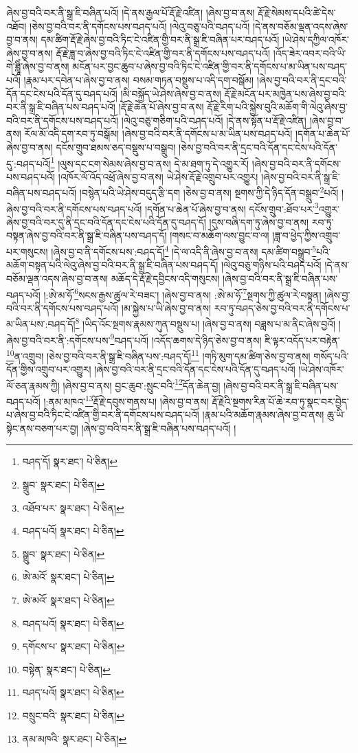 ཞེས་བྱ་བའི་བར་ནི་སྒྲ་ཇི་བཞིན་པའོ། །དེ་ནས་རྒྱལ་པོ་རྡོ་རྗེ་འཛིན། །ཞེས་བྱ་བ་ནས། རྡོ་རྗེ་སེམས་དཔའི་ཚེ་དེས་འཐོབ། །ཅེས་བྱ་བའི་བར་ནི་དགོངས་པས་བཤད་པའོ། །ལེའུ་བཅུ་པའི་བཤད་པའོ། །དེ་ནས་བཅོམ་ལྡན་འདས་ཞེས་བྱ་བ་ནས། དམ་ཚིག་རྡོ་རྗེ་ཞེས་བྱ་བའི་ཏིང་ངེ་འཛིན་གྱི་བར་ནི་སྒྲ་ཇི་བཞིན་པར་བཤད་པའོ། །ཡེ་ཤེས་དཀྱིལ་འཁོར་ཞེས་བྱ་བ་ནས། རྡོ་རྗེ་ཟླ་བ་ཞེས་བྱ་བའི་ཏིང་ངེ་འཛིན་གྱི་བར་ནི་དགོངས་པས་བཤད་པའོ། །འོད་ཟེར་འབར་བའི་ཡི་གེ་ཐླཱིཾ་ཞེས་བྱ་བ་ནས། མངོན་པར་བྱང་ཆུབ་པ་ཞེས་བྱ་བའི་ཏིང་ངེ་འཛིན་གྱི་བར་ནི་དགོངས་པ་མ་ཡིན་པས་བཤད་པའོ། །རྣམ་པར་དབེན་པ་ཞེས་བྱ་བ་ནས། བསམ་གཏན་བསྡུས་པ་འདི་དག་བསྒོམ། །ཞེས་བྱ་བའི་བར་ནི་དྲང་བའི་དོན་དང་ངེས་པའི་དོན་དུ་བཤད་པའོ། །མི་བསྐྱོད་ཡེ་ཤེས་ཞེས་བྱ་བ་ནས། རྡོ་རྗེ་མངོན་པར་མཁྱེན་པས་ཞེས་བྱ་བའི་བར་ནི་སྒྲ་ཇི་བཞིན་པས་བཤད་པའོ། །རྡོ་རྗེ་ཆེན་པོ་ཞེས་བྱ་བ་ནས། རྡོ་རྗེ་རིག་པའི་སྐྱེས་བུའི་མཆོག་གི་ལེའུ་ཞེས་བྱ་བའི་བར་ནི་དགོངས་པས་བཤད་པའོ། །ལེའུ་བཅུ་གཅིག་པའི་བཤད་པའོ། །དེ་ནས་སྟོན་པ་རྡོ་རྗེ་འཛིན། །ཞེས་བྱ་བ་ནས། རོལ་མོ་འདི་དག་རབ་ཏུ་བསྒོམ། །ཞེས་བྱ་བའི་བར་ནི་དགོངས་པ་མ་ཡིན་པས་བཤད་པའོ། །དགོན་པ་ཆེན་པོ་ཞེས་བྱ་བ་ནས། དངོས་གྲུབ་ཐམས་ཅད་བསྡུས་པ་བསྒྲུབ། །ཅེས་བྱ་བའི་བར་ནི་དྲང་བའི་དོན་དང་ངེས་པའི་དོན་དུ་:བཤད་པའོ།\footnote{བཤད་དོ།  སྣར་ཐང་།  པེ་ཅིན། } །ལུས་དང་ངག་སེམས་ཞེས་བྱ་བ་ནས། དེ་མ་ཐག་ཏུ་དེ་འགྱུར་རོ། །ཞེས་བྱ་བའི་བར་ནི་དགོངས་པས་བཤད་པའོ། །འཁོར་ལོ་འོད་འཕྲོ་ཞེས་བྱ་བ་ནས། ཡེ་ཤེས་རྡོ་རྗེ་འགྲུབ་པར་འགྱུར། །ཞེས་བྱ་བའི་བར་ནི་སྒྲ་ཇི་བཞིན་པས་བཤད་པའོ། །བསྙེན་པའི་ཡེ་ཤེས་བདུད་རྩི་དག །ཅེས་བྱ་བ་ནས། སྔགས་ཀྱི་དེ་ཉིད་དོན་བསྒྲུབ་\footnote{སྒྲུབ་  སྣར་ཐང་།  པེ་ཅིན། }པའོ། །ཞེས་བྱ་བའི་བར་ནི་དགོངས་པས་བཤད་པའོ། །དགོན་པ་ཆེན་པོ་ཞེས་བྱ་བ་ནས། དངོས་གྲུབ་:ཐོབ་པར་\footnote{འཐོབ་པར་  སྣར་ཐང་།  པེ་ཅིན། }འགྱུར་ཞེས་བྱ་བའི་བར་དུ་ནི་དྲང་བའི་དོན་དང་ངེས་པའི་དོན་དུ་བཤད་དོ། །དུས་བཞི་དག་ཏུ་ཞེས་བྱ་བ་ནས། རབ་ཏུ་བསྟན་ཞེས་བྱ་བའི་བར་ནི་སྒྲ་ཇི་བཞིན་པས་བཤད་དོ། །གསང་བ་མཆོག་ལས་བྱུང་བ་ལ། །ཟླ་བ་ཕྱེད་ཀྱིས་འགྲུབ་པར་གསུངས། །ཞེས་བྱ་བ་ནི་དགོངས་པས་:བཤད་དོ།\footnote{བཤད་པའོ།  སྣར་ཐང་།  པེ་ཅིན། } །དེ་ལ་འདི་ནི་ཞེས་བྱ་བ་ནས། དམ་ཚིག་བསྒྲུབ་\footnote{སྒྲུབ་  སྣར་ཐང་།  པེ་ཅིན། }པའི་མཆོག་བསྟན་པའི་ལེའུ་ཞེས་བྱ་བའི་བར་ནི་སྒྲ་ཇི་བཞིན་པས་བཤད་དོ། །ལེའུ་བཅུ་གཉིས་པའི་བཤད་པའོ། །དེ་ནས་བཅོམ་ལྡན་འདས་ཞེས་བྱ་བ་ནས། མཆོད་དེ་རྡོ་རྗེ་དབྱིངས་འདི་གསུངས། །ཞེས་བྱ་བའི་བར་ནི་སྒྲ་ཇི་བཞིན་པས་བཤད་པའོ། །:ཨེ་མ་ཧོ་\footnote{ཨེ་མའོ་  སྣར་ཐང་།  པེ་ཅིན། }སངས་རྒྱས་ཚུལ་རེ་བཟང་། །ཞེས་བྱ་བ་ནས། :ཨེ་མ་ཧོ་\footnote{ཨེ་མའོ་  སྣར་ཐང་།  པེ་ཅིན། }སྔགས་ཀྱི་ཚུལ་རེ་བསྟན། །ཞེས་བྱ་བའི་བར་ནི་དགོངས་པས་བཤད་པའོ། །མ་སྐྱེས་པ་ཡི་ཞེས་བྱ་བ་ནས། རབ་ཏུ་བཤད་ཅེས་བྱ་བའི་བར་ནི་དགོངས་པ་མ་ཡིན་པས་:བཤད་དོ།\footnote{བཤད་པའོ།  སྣར་ཐང་།  པེ་ཅིན། } །ཡིད་འོང་སྔགས་རྣམས་ཀུན་བསྡུས་པ། །ཞེས་བྱ་བ་ནས། བཟླས་པ་མ་ནིང་ཞེས་བྱའོ། །ཞེས་བྱ་བའི་བར་ནི་:དགོངས་པས་\footnote{དགོངས་པ་  སྣར་ཐང་།  པེ་ཅིན། }བཤད་པའོ། །འདོད་ཆགས་དེ་ཉིད་ཅེས་བྱ་བ་ནས། ཇི་ལྟར་འདོད་པར་བརྟེན་\footnote{བསྟེན་  སྣར་ཐང་།  པེ་ཅིན། }ན་འགྲུབ། །ཅེས་བྱ་བའི་བར་ནི་སྒྲ་ཇི་བཞིན་པས་:བཤད་དོ།\footnote{བཤད་པའོ།  སྣར་ཐང་།  པེ་ཅིན། } །གཏི་མུག་དམ་ཚིག་ཅེས་བྱ་བ་ནས། གསོད་པའི་དོན་གྱིས་འགྲུབ་པར་འགྱུར། །ཞེས་བྱ་བའི་བར་ནི་དྲང་བའི་དོན་དང་ངེས་པའི་དོན་དུ་བཤད་པའོ། །ཡེ་ཤེས་འཁོར་ལོ་ཅན་རྣམས་ཀྱི། །ཞེས་བྱ་བ་ནས། བྱང་ཆུབ་:སྲུང་བའི་\footnote{བསྲུང་བའི་  སྣར་ཐང་།  པེ་ཅིན། }དོན་ཆེན་བྱ། །ཞེས་བྱ་བའི་བར་ནི་སྒྲ་ཇི་བཞིན་པས་བཤད་པའོ། །:ནམ་མཁའ་\footnote{ནམ་མཁའི་  སྣར་ཐང་།  པེ་ཅིན། }རྡོ་རྗེ་དབུས་གནས་པ། །ཞེས་བྱ་བ་ནས། རྡོ་རྗེའི་སྔགས་རིན་པོ་ཆེ་རབ་ཏུ་སྣང་བར་བྱེད་པ་ཞེས་བྱ་བའི་ཏིང་ངེ་འཛིན་གྱི་བར་ནི་དགོངས་པས་བཤད་པའོ། །རྣམ་པའི་མཆོག་རྣམས་ཞེས་བྱ་བ་ནས། ཆུ་ཡི་སྟེང་ནས་བཅག་པར་བྱ། །ཞེས་བྱ་བའི་བར་ནི་སྒྲ་ཇི་བཞིན་པས་བཤད་པའོ། །

